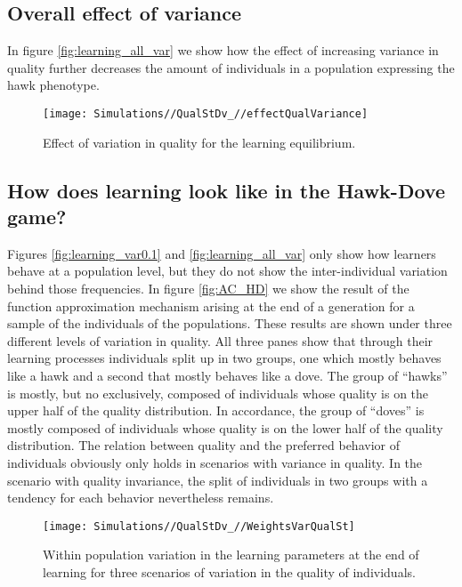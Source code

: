 \documentclass[]{article}
\begin{document}
\subsection{Overall effect of
variance}\label{overall-effect-of-variance}

In figure \ref{fig:learning_all_var} we show how the effect of
increasing variance in quality further decreases the amount of
individuals in a population expressing the hawk phenotype.

\begin{figure}
\texttt{[image: Simulations//QualStDv\_//effectQualVariance]} \caption{\label{fig:learning_all_var}Effect of variation in quality for the learning equilibrium.}\label{fig:fig5}
\end{figure}

\subsection{How does learning look like in the Hawk-Dove
game?}\label{how-does-learning-look-like-in-the-hawk-dove-game}

Figures \ref{fig:learning_var0.1} and \ref{fig:learning_all_var} only
show how learners behave at a population level, but they do not show the
inter-individual variation behind those frequencies. In figure
\ref{fig:AC_HD} we show the result of the function approximation
mechanism arising at the end of a generation for a sample of the
individuals of the populations. These results are shown under three
different levels of variation in quality. All three panes show that
through their learning processes individuals split up in two groups, one
which mostly behaves like a hawk and a second that mostly behaves like a
dove. The group of ``hawks'' is mostly, but no exclusively, composed of
individuals whose quality is on the upper half of the quality
distribution. In accordance, the group of ``doves'' is mostly composed
of individuals whose quality is on the lower half of the quality
distribution. The relation between quality and the preferred behavior of
individuals obviously only holds in scenarios with variance in quality.
In the scenario with quality invariance, the split of individuals in two
groups with a tendency for each behavior nevertheless remains.

\begin{figure}
\texttt{[image: Simulations//QualStDv\_//WeightsVarQualSt]} \caption{\label{fig:AC_HD}Within population variation in the learning parameters at the end of learning for three scenarios of variation in the quality of individuals.}\label{fig:fig6}
\end{figure}
\end{document}
